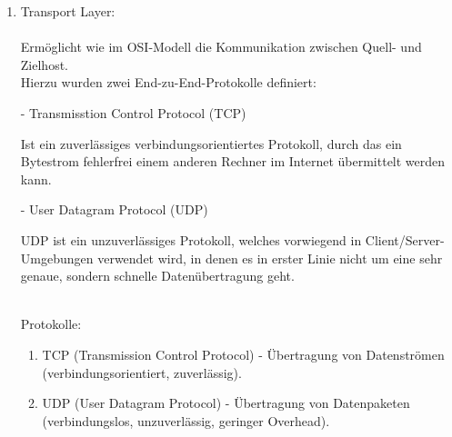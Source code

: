 \documentclass[11pt]{article}
\begin{document}
\begin{enumerate}
\begin{addmargin}[1em]{1em}
\begin{enumerate}
                \item Z39.50 - Abfrage von Informationssystemen\\

            \end{enumerate}
        \end{addmargin}


        \item Transport Layer:\\\\
        Ermöglicht wie im OSI-Modell die Kommunikation zwischen Quell- und Zielhost.\\
        Hierzu wurden zwei End-zu-End-Protokolle definiert:\\

        \begin{addmargin}[1em]{1em}

            - Transmisstion Control Protocol (TCP)\\
            \begin{addmargin}[1em]{1em}

                Ist ein zuverlässiges verbindungsorientiertes Protokoll, durch das
                ein Bytestrom fehlerfrei einem anderen Rechner im Internet übermittelt
                werden kann.\\

            \end{addmargin}
            - User Datagram Protocol (UDP)\\
            \begin{addmargin}[1em]{1em}

                UDP ist ein unzuverlässiges Protokoll, welches vorwiegend in Client/Server-
                Umgebungen verwendet wird, in denen es in erster Linie nicht um eine sehr genaue,
                sondern schnelle Datenübertragung geht.\\\\

            \end{addmargin}

            Protokolle:
            \begin{enumerate}

                \item TCP (Transmission Control Protocol) - Übertragung von Datenströmen
                (verbindungsorientiert, zuverlässig).\\

                \item UDP (User Datagram Protocol) - Übertragung von Datenpaketen
                (verbindungslos, unzuverlässig, geringer Overhead).\\


\end{enumerate}
\end{addmargin}
\end{enumerate}
\end{document}
